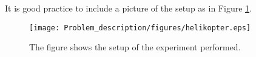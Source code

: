 It is good practice to include a picture of the setup as in Figure \ref{fig:setup}.
\begin{figure}[htb]
    \centering
    \texttt{[image: Problem\_description/figures/helikopter.eps]}
    \caption{The figure shows the setup of the experiment performed.}
    \label{fig:setup}
\end{figure}
